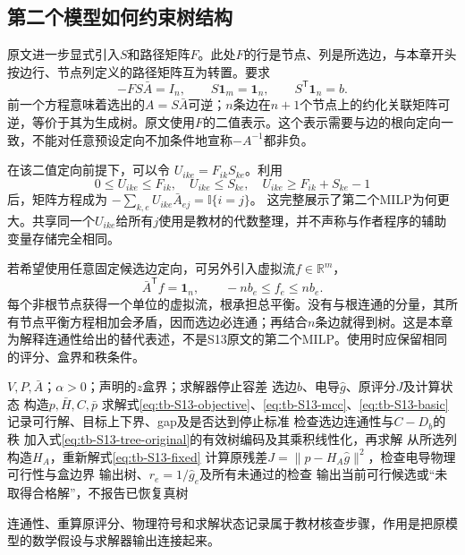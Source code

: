\subsection{第二个模型如何约束树结构}

原文进一步显式引入$S$和路径矩阵$F$。此处$F$的行是节点、列是所选边，与本章开头按边行、节点列定义的路径矩阵互为转置。要求
\begin{equation}
 -FS\bar A=I_n,\qquad
 S\mathbf1_m=\mathbf1_n,\qquad
 S^{\mathsf T}\mathbf1_n=b.
 \label{eq:tb-S13-tree-original}
\end{equation}
前一个方程意味着选出的$A=S\bar A$可逆；$n$条边在$n+1$个节点上的约化关联矩阵可逆，等价于其为生成树。原文使用$F$的二值表示。这个表示需要与边的根向定向一致，不能对任意预设定向不加条件地宣称$-A^{-1}$都非负。

在该二值定向前提下，可以令
$U_{ike}=F_{ik}S_{ke}$。利用
\[
 0\leq U_{ike}\leq F_{ik},\quad
 U_{ike}\leq S_{ke},\quad
 U_{ike}\geq F_{ik}+S_{ke}-1
\]
后，矩阵方程成为
$-\sum_{k,e}U_{ike}\bar A_{ej}=\mathbb I\{i=j\}$。
这完整展示了第二个MILP为何更大。共享同一个$U_{ike}$给所有$j$使用是教材的代数整理，并不声称与作者程序的辅助变量存储完全相同。

\begin{remark}
若希望使用任意固定候选边定向，可另外引入虚拟流$f\in\mathbb R^m$，
\begin{equation}
 \bar A^{\mathsf T}f=\mathbf1_n,\qquad -nb_e\leq f_e\leq nb_e.
 \label{eq:tb-S13-flow-extra}
\end{equation}
每个非根节点获得一个单位的虚拟流，根承担总平衡。没有与根连通的分量，其所有节点平衡方程相加会矛盾，因而选边必连通；再结合$n$条边就得到树。这是本章为解释连通性给出的替代表述，不是S13原文的第二个MILP。使用时应保留相同的评分、盒界和秩条件。
\end{remark}

\begin{algorithm}[htbp]
\caption{S13的两阶段求解流程：原文模型加教材核查步骤}
\label{alg:tb-S13}
\begin{algorithmic}[1]
\Require $V,P,\bar A$；$\alpha>0$；声明的$z$盒界；求解器停止容差
\Ensure 选边$b$、电导$\widehat g$、原评分$J$及计算状态
\State 构造$p,\bar H,C,\bar p$
\State 求解式\eqref{eq:tb-S13-objective}、\eqref{eq:tb-S13-mcc}、\eqref{eq:tb-S13-basic}
\State 记录可行解、目标上下界、gap及是否达到停止标准
\State 检查选边连通性与$C-D_b$的秩
 \State 加入式\eqref{eq:tb-S13-tree-original}的有效树编码及其乘积线性化，再求解
\EndIf
{}
 \State 从所选列构造$H_A$，重新解式\eqref{eq:tb-S13-fixed}
 \State 计算原残差$J=\|p-H_A\widehat g\|^2$，检查电导物理可行性与盒边界
 \State 输出树、$r_e=1/\widehat g_e$及所有未通过的检查
\Else
 \State 输出当前可行候选或“未取得合格解”，不报告已恢复真树
\EndIf
\end{algorithmic}
\end{algorithm}
连通性、重算原评分、物理符号和求解状态记录属于教材核查步骤，作用是把原模型的数学假设与求解器输出连接起来。

